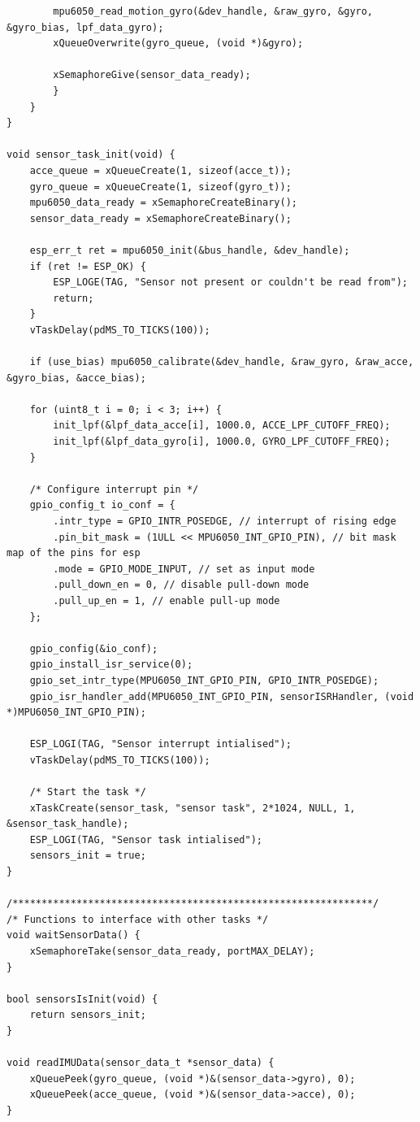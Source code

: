 \begin{lstlisting}
        mpu6050_read_motion_gyro(&dev_handle, &raw_gyro, &gyro, &gyro_bias, lpf_data_gyro);
        xQueueOverwrite(gyro_queue, (void *)&gyro);

        xSemaphoreGive(sensor_data_ready); 
        }
    }
}

void sensor_task_init(void) {
    acce_queue = xQueueCreate(1, sizeof(acce_t));
    gyro_queue = xQueueCreate(1, sizeof(gyro_t));
    mpu6050_data_ready = xSemaphoreCreateBinary();
    sensor_data_ready = xSemaphoreCreateBinary();

    esp_err_t ret = mpu6050_init(&bus_handle, &dev_handle);
    if (ret != ESP_OK) {
        ESP_LOGE(TAG, "Sensor not present or couldn't be read from");
        return;
    }
    vTaskDelay(pdMS_TO_TICKS(100)); 

    if (use_bias) mpu6050_calibrate(&dev_handle, &raw_gyro, &raw_acce, &gyro_bias, &acce_bias);

    for (uint8_t i = 0; i < 3; i++) {
        init_lpf(&lpf_data_acce[i], 1000.0, ACCE_LPF_CUTOFF_FREQ);
        init_lpf(&lpf_data_gyro[i], 1000.0, GYRO_LPF_CUTOFF_FREQ);
    }

    /* Configure interrupt pin */
    gpio_config_t io_conf = {
        .intr_type = GPIO_INTR_POSEDGE, // interrupt of rising edge
        .pin_bit_mask = (1ULL << MPU6050_INT_GPIO_PIN), // bit mask map of the pins for esp
        .mode = GPIO_MODE_INPUT, // set as input mode
        .pull_down_en = 0, // disable pull-down mode
        .pull_up_en = 1, // enable pull-up mode
    };
    
    gpio_config(&io_conf);
    gpio_install_isr_service(0);
    gpio_set_intr_type(MPU6050_INT_GPIO_PIN, GPIO_INTR_POSEDGE);
    gpio_isr_handler_add(MPU6050_INT_GPIO_PIN, sensorISRHandler, (void *)MPU6050_INT_GPIO_PIN);

    ESP_LOGI(TAG, "Sensor interrupt intialised");
    vTaskDelay(pdMS_TO_TICKS(100)); 

    /* Start the task */
    xTaskCreate(sensor_task, "sensor task", 2*1024, NULL, 1, &sensor_task_handle);
    ESP_LOGI(TAG, "Sensor task intialised");
    sensors_init = true; 
}

/**************************************************************/
/* Functions to interface with other tasks */
void waitSensorData() { 
    xSemaphoreTake(sensor_data_ready, portMAX_DELAY);
}

bool sensorsIsInit(void) {
    return sensors_init;
}

void readIMUData(sensor_data_t *sensor_data) {
    xQueuePeek(gyro_queue, (void *)&(sensor_data->gyro), 0);
    xQueuePeek(acce_queue, (void *)&(sensor_data->acce), 0);
}


\end{lstlisting}
